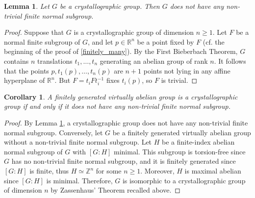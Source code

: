\documentclass[a4paper, 11pt]{amsart}
\newtheorem{co}[te]{Corollary}
\newtheorem{lemme}[te]{Lemma}
\theoremstyle{definition}
\theoremstyle{remark}
\renewcommand{\geq}{\geqslant}
\begin{document}
\begin{lemme}\label{no_normal_finite_subgroup}Let $G$ be a crystallographic group. Then $G$ does not have any non-trivial finite normal subgroup.\end{lemme}

\begin{proof}Suppose that $G$ is a crystallographic group of dimension $n\geq 1$. Let $F$ be a normal finite subgroup of $G$, and let $p\in \mathbb{R}^n$ be a point fixed by $F$ (cf. the beginning of the proof of \ref{finitely_many}). By the First Bieberbach Theorem, $G$ contains $n$ translations $t_1,\ldots,t_n$ generating an abelian group of rank $n$. It follows that the points $p,t_1(p),\ldots,t_n(p)$ are $n+1$ points not lying in any affine hyperplane of $\mathbb{R}^n$. But $F=t_iFt_i^{-1}$ fixes $t_i(p)$, so $F$ is trivial.\end{proof}


\begin{co}
A finitely generated virtually abelian group is a crystallographic group if and only if it does not have any non-trivial finite normal subgroup.
\end{co}

\begin{proof}
By Lemma \ref{no_normal_finite_subgroup}, a crystallographic group does not have any non-trivial finite normal subgroup. Conversely, let $G$ be a finitely generated virtually abelian group without a non-trivial finite normal subgroup. Let $H$ be a finite-index abelian normal subgroup of $G$ with $[G:H]$ minimal. This subgroup is torsion-free since $G$ has no non-trivial finite normal subgroup, and it is finitely generated since $[G:H]$ is finite, thus $H\simeq \mathbb{Z}^n$ for some $n\geq 1$. Moreover, $H$ is maximal abelian since $[G:H]$ is minimal. Therefore, $G$ is isomorphic to a crystallographic group of dimension $n$ by Zassenhaus' Theorem recalled above.\end{proof}
\end{document}
